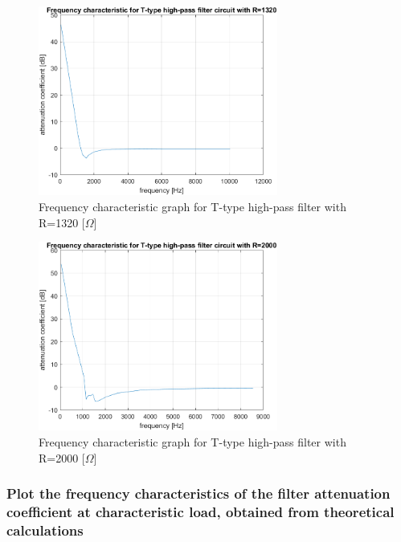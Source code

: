\documentclass[]{scrartcl}
\begin{document}
\begin{figure}[H]
	\centering
	\includegraphics[width=0.7\textwidth]{Pictures/high_filter_1320.png}
	\caption{Frequency characteristic graph for T-type high-pass filter with R=1320 [$\Omega$]}
	\label{fig:R=1320 char}
\end{figure}

\begin{figure}[H]
	\centering
	\includegraphics[width=0.7\textwidth]{Pictures/high_filter_2000.png}
	\caption{Frequency characteristic graph for T-type high-pass filter with R=2000 [$\Omega$]}
	\label{fig:R=2000 char}
\end{figure}

\subsubsection{Plot the frequency characteristics of the filter attenuation coefficient at characteristic load, obtained from theoretical calculations}
\end{document}
